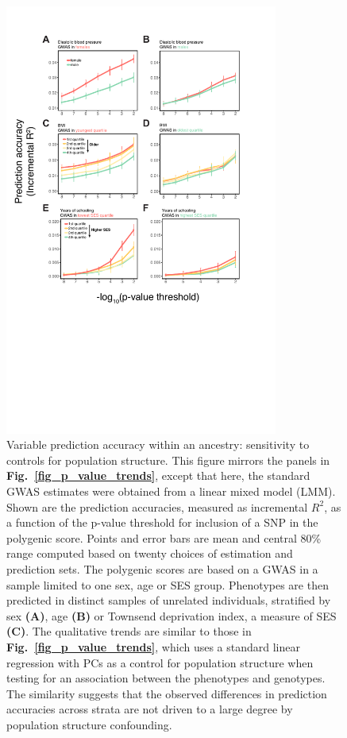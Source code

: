 \documentclass[hidelinks, 12pt]{article}
\begin{document}
\pagebreak

\begin{figure}[h]
\centering
\includegraphics[width=0.8\textwidth]{./supp_figures/bolt.pdf}
\caption[Variable prediction accuracy within an ancestry: sensitivity to controls for population structure]{\small Variable prediction accuracy within an ancestry: sensitivity to controls for population structure. This figure mirrors the panels in {\bf Fig.~\ref{fig_p_value_trends}}, except that here, the standard GWAS estimates were obtained from a linear mixed model (LMM). Shown are the prediction accuracies, measured as incremental $R^2$, as a function of the p-value threshold for inclusion of a SNP in the polygenic score. Points and error bars are mean and central 80\% range computed based on twenty choices of estimation and prediction sets. The polygenic scores are based on a GWAS in a sample limited to one sex, age or SES group. Phenotypes are then predicted in distinct samples of unrelated individuals, stratified by sex {\bf (A)}, age {\bf (B)} or Townsend deprivation index, a measure of SES {\bf (C)}. The qualitative trends are similar to those in {\bf Fig.~\ref{fig_p_value_trends}}, which uses a standard linear regression with PCs as a control for population structure when testing for an association between the phenotypes and genotypes. The similarity suggests that the observed differences in prediction accuracies across strata are not driven to a large degree by population structure confounding.}
\centering
\end{figure}
\end{document}
